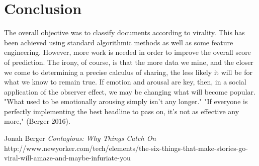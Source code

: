 \documentclass[twoside,twocolumn]{article}
\begin{document}
\section{Conclusion}
The overall objective was to classify documents according to virality. This has been achieved using standard algorithmic methods as well as some feature engineering. However, more work is needed in order to improve the overall score of prediction.
The irony, of course, is that the more data we mine, and the closer we come to determining a precise calculus of sharing, the less likely it will be for what we know to remain true. If emotion and arousal are key, then, in a social application of the observer effect, we may be changing what will become popular. "What used to be emotionally arousing simply isn't any longer." "If everyone is perfectly implementing the best headline to pass on, it's not as effective any more," (Berger 2016). 

\begin{thebibliography}{99} %

Jonah Berger {\em Contagious: Why Things Catch On}
 http://www.newyorker.com/tech/elements/the-six-things-that-make-stories-go-viral-will-amaze-and-maybe-infuriate-you
\end{thebibliography}

\end{document}
